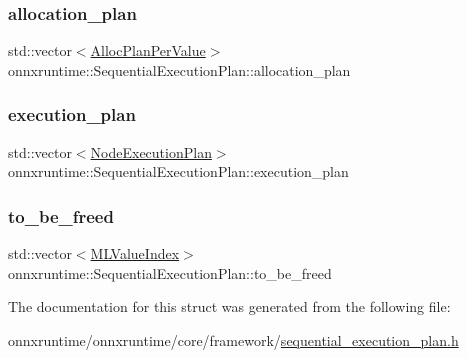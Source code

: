 \subsubsection{\texorpdfstring{allocation\+\_\+plan}{allocation\_plan}}
{\footnotesize\ttfamily std\+::vector$<$\mbox{\hyperlink{structonnxruntime_1_1SequentialExecutionPlan_1_1AllocPlanPerValue}{Alloc\+Plan\+Per\+Value}}$>$ onnxruntime\+::\+Sequential\+Execution\+Plan\+::allocation\+\_\+plan}

\mbox{\label{structonnxruntime_1_1SequentialExecutionPlan_a8dd9976847a1549154b538736b633ce1}} 
\subsubsection{\texorpdfstring{execution\+\_\+plan}{execution\_plan}}
{\footnotesize\ttfamily std\+::vector$<$\mbox{\hyperlink{structonnxruntime_1_1SequentialExecutionPlan_1_1NodeExecutionPlan}{Node\+Execution\+Plan}}$>$ onnxruntime\+::\+Sequential\+Execution\+Plan\+::execution\+\_\+plan}

\mbox{\label{structonnxruntime_1_1SequentialExecutionPlan_abfe34159a6b29c1d2c705b9e77e93875}} 
\subsubsection{\texorpdfstring{to\+\_\+be\+\_\+freed}{to\_be\_freed}}
{\footnotesize\ttfamily std\+::vector$<$\mbox{\hyperlink{namespaceonnxruntime_ab37a9454e2bb44bd7f75a95158097c8a}{M\+L\+Value\+Index}}$>$ onnxruntime\+::\+Sequential\+Execution\+Plan\+::to\+\_\+be\+\_\+freed}



The documentation for this struct was generated from the following file\+:\begin{DoxyCompactItemize}
\item 
onnxruntime/onnxruntime/core/framework/\mbox{\hyperlink{sequential__execution__plan_8h}{sequential\+\_\+execution\+\_\+plan.\+h}}\end{DoxyCompactItemize}
